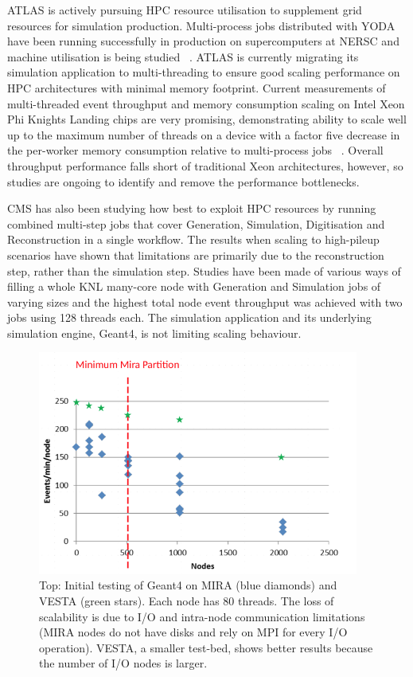 \documentclass[12pt,a4paper]{article}
\begin{document}
{ATLAS is actively pursuing HPC resource utilisation to supplement grid
resources for simulation production. Multi-process jobs distributed with
YODA have been running successfully in production on supercomputers at
NERSC and machine utilisation is being studied ~\cite{1742-6596-664-9-092025}. ATLAS is
currently migrating its simulation application to multi-threading to
ensure good scaling performance on HPC architectures with minimal memory
footprint. Current measurements of multi-threaded event throughput and
memory consumption scaling on Intel Xeon Phi Knights Landing chips are
very promising, demonstrating ability to scale well up to the maximum
number of threads on a device with a factor five decrease in the
per-worker memory consumption relative to multi-process jobs ~\cite{Farrell:2242857}.
Overall throughput performance falls short of traditional Xeon
architectures, however, so studies are ongoing to identify and remove
the performance bottlenecks.

CMS has also been studying how best to exploit HPC resources by running
combined multi-step jobs that cover Generation, Simulation, Digitisation
and Reconstruction in a single workflow. The results when scaling to
high-pileup scenarios have shown that limitations are primarily due to
the reconstruction step, rather than the simulation step. Studies have
been made of various ways of filling a whole KNL many-core node with
Generation and Simulation jobs of varying sizes and the highest total
node event throughput was achieved with two jobs using 128 threads each.
The simulation application and its underlying simulation engine, Geant4,
is not limiting scaling behaviour.

\begin{figure}[bthp]
\vspace*{0.3cm}
\centering
\includegraphics[width=0.94\textwidth]{image24.png}
\caption{Top: Initial testing of Geant4 on MIRA (blue diamonds) and VESTA
(green stars). Each node has 80 threads. The loss of scalability is due
to I/O and intra-node communication limitations (MIRA nodes do not have
disks and rely on MPI for every I/O operation). VESTA, a smaller
test-bed, shows better results because the number of I/O nodes is
larger. }
\label{fig:mira}
\end{figure}

}
\end{document}
